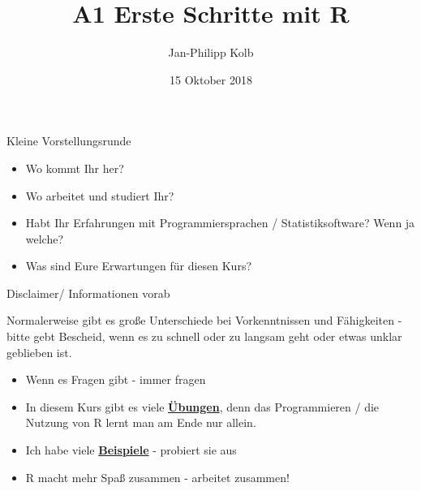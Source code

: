 \documentclass[ignorenonframetext,]{beamer}
\title{A1 Erste Schritte mit R}
\author{Jan-Philipp Kolb}
\date{15 Oktober 2018}
\providecommand{\tightlist}{%
  \setlength{\itemsep}{0pt}\setlength{\parskip}{0pt}}
\begin{document}
\frame{\titlepage}

\begin{frame}{Kleine Vorstellungsrunde}
\protect\hypertarget{kleine-vorstellungsrunde}{}

\begin{itemize}
\tightlist
\item
  Wo kommt Ihr her?
\item
  Wo arbeitet und studiert Ihr?
\item
  Habt Ihr Erfahrungen mit Programmiersprachen / Statistiksoftware? Wenn
  ja welche?
\item
  Was sind Eure Erwartungen für diesen Kurs?
\end{itemize}

\end{frame}

\begin{frame}{Disclaimer/ Informationen vorab}
\protect\hypertarget{disclaimer-informationen-vorab}{}

Normalerweise gibt es große Unterschiede bei Vorkenntnissen und
Fähigkeiten - bitte gebt Bescheid, wenn es zu schnell oder zu langsam
geht oder etwas unklar geblieben ist.

\begin{itemize}
\tightlist
\item
  Wenn es Fragen gibt - immer fragen
\item
  In diesem Kurs gibt es viele
  \href{http://web.math.ku.dk/~helle/R-intro/exercises.pdf}{\textbf{Übungen}},
  denn das Programmieren / die Nutzung von R lernt man am Ende nur
  allein.
\item
  Ich habe viele \href{https://www.showmeshiny.com/}{\textbf{Beispiele}}
  - probiert sie aus
\item
  R macht mehr Spaß zusammen - arbeitet zusammen!
\end{itemize}

\end{frame}
\end{document}
